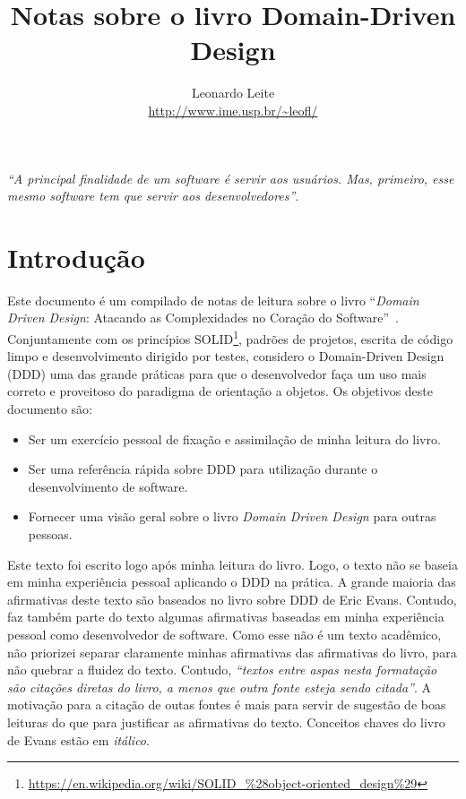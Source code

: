\documentclass[a4paper, 12pt]{article}
\title{Notas sobre o livro Domain-Driven Design}
\author{Leonardo Leite \\ {\footnotesize \url{http://www.ime.usp.br/~leofl/}}}
\newcommand{\citacao}[1]{\emph{``#1''}}
\newcommand{\ddd}{\emph{Domain Driven Design}\xspace}
\begin{document}
\maketitle

\citacao{A principal finalidade de um software é servir aos usuários. Mas, primeiro, esse mesmo software tem que servir aos desenvolvedores}.

\section{Introdução}

Este documento é um compilado de notas de leitura sobre o livro ``\ddd: Atacando as Complexidades no Coração do Software''~\cite{Evans2003DDD}. Conjuntamente com os princípios SOLID\footnote{\url{https://en.wikipedia.org/wiki/SOLID_\%28object-oriented_design\%29}}, padrões de projetos, escrita de código limpo e desenvolvimento dirigido por testes, considero o Domain-Driven Design (DDD) uma das grande práticas para que o desenvolvedor faça um uso mais correto e proveitoso do paradigma de orientação a objetos. Os objetivos deste documento são:

\begin{itemize}
\item Ser um exercício pessoal de fixação e assimilação de minha leitura do livro.
\item Ser uma referência rápida sobre DDD para utilização durante o desenvolvimento de software.
\item Fornecer uma visão geral sobre o livro \ddd para outras pessoas.
\end{itemize}

Este texto foi escrito logo após minha leitura do livro. Logo, o texto não se baseia em minha experiência pessoal aplicando o DDD na prática. A grande maioria das afirmativas deste texto são baseados no livro sobre DDD de Eric Evans. Contudo, faz também parte do texto algumas afirmativas baseadas em minha experiência pessoal como desenvolvedor de software. Como esse não é um texto acadêmico, não priorizei separar claramente minhas afirmativas das afirmativas do livro, para não quebrar a fluidez do texto. Contudo, \citacao{textos entre aspas nesta formatação são citações diretas do livro, a menos que outra fonte esteja sendo citada}. A motivação para a citação de outas fontes é mais para servir de sugestão de boas leituras do que para justificar as afirmativas do texto. Conceitos chaves do livro de Evans estão em \emph{itálico}.
\end{document}
